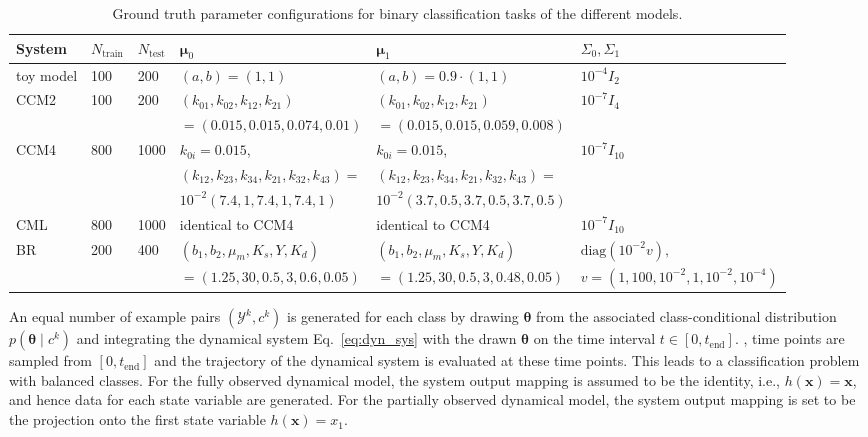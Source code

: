 \begin{table*}[t]
    \centering
    \caption{Ground truth parameter configurations for binary classification tasks of the different models.}
    \begin{tabular}{p{1.2cm}p{0.8cm}p{0.8cm}p{4cm}p{4cm}p{4.5cm}}
        \hline
        System & $N_{\text{train}}$ & $N_{\text{test}}$ & $\boldsymbol{\mu}_{0}$ & $\boldsymbol{\mu}_{1}$ & $\Sigma_{0}, \Sigma_{1}$  \\
        \hline
        toy model & 100 & 200 & $(a,b) = (1,1)$ & $(a,b) = 0.9 \cdot (1,1)$ & $10^{-4} I_{2}$ \\
        CCM2 & 100 & 200 & $(k_{01}, k_{02}, k_{12}, k_{21})$ & $(k_{01}, k_{02}, k_{12}, k_{21})$ & $10^{-7} I_{4}$ \\
             &     &     & $ = (0.015,0.015,0.074,0.01)$      & $= (0.015,0.015,0.059,0.008)$      &  \\
        CCM4 & 800 & 1000 & $k_{0i} = 0.015$,                                    & $k_{0i} = 0.015$,  & $10^{-7} I_{10}$ \\
            &     &      & $(k_{12}, k_{23}, k_{34}, k_{21}, k_{32}, k_{43})=$  & $(k_{12}, k_{23}, k_{34}, k_{21}, k_{32}, k_{43})=$                   & \\
            &     &      & $10^{-2}(7.4,1,7.4,1,7.4,1)$ & $10^{-2}(3.7,0.5,3.7,0.5,3.7,0.5)$                   &  \\
        CML & 800 & 1000 & identical to CCM4 & identical to CCM4 & $10^{-7} I_{10}$ \\
        BR & 200 & 400 & $(b_{1}, b_{2}, \mu_{m}, K_{s}, Y, K_{d})$ & $(b_{1}, b_{2}, \mu_{m}, K_{s}, Y, K_{d})$ & $\text{diag}(10^{-2}v),$  \\
           &     &     & $= (1.25,30,0.5,3,0.6,0.05)$               & $= (1.25,30,0.5,3,0.48,0.05)$              & $v=(1, 100, 10^{-2}, 1, 10^{-2}, 10^{-4})$ \\
        \hline
    \end{tabular}
    \label{tab:gt_parameters}
\end{table*}

An equal number of example pairs $(\mathcal{Y}^{k},c^{k})$ is generated for each class by  drawing $\boldsymbol{\theta}$ from the associated class-conditional distribution $p(\boldsymbol{\theta} \mid c^{k})$ and  integrating the dynamical system Eq.~\eqref{eq:dyn_sys} with the drawn $\boldsymbol{\theta}$ on the time interval $t \in [0, t_{\text{end}}]$.
, time points are sampled from $[0, t_{\text{end}}]$ and the trajectory of the dynamical system is evaluated at these time points.
This leads to a classification problem with balanced classes.
For the fully observed dynamical model, the system output mapping is assumed to be the identity, i.e., $h(\mathbf{x}) = \mathbf{x}$, and hence data for each state variable are generated.
For the partially observed dynamical model, the system output mapping is set to be the projection onto the first state variable $h(\mathbf{x}) = x_{1}$.

